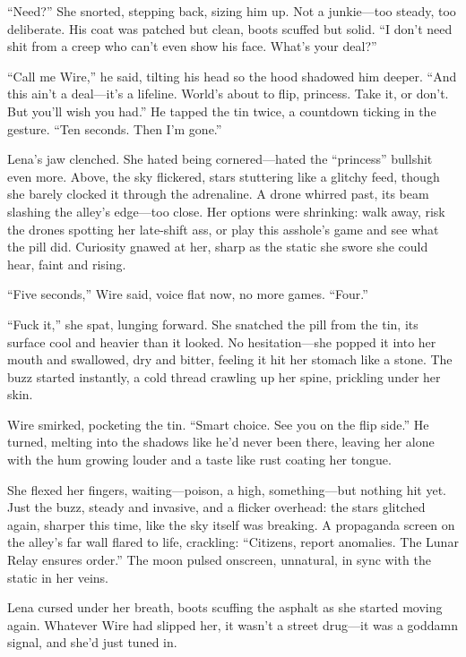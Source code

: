 \documentclass[12pt]{book}
\begin{document}
``Need?'' She snorted, stepping back, sizing him up. Not a junkie---too steady, too deliberate. His coat was patched but clean, boots scuffed but solid. ``I don't need shit from a creep who can't even show his face. What's your deal?''

``Call me Wire,'' he said, tilting his head so the hood shadowed him deeper. ``And this ain't a deal---it's a lifeline. World's about to flip, princess. Take it, or don't. But you'll wish you had.'' He tapped the tin twice, a countdown ticking in the gesture. ``Ten seconds. Then I'm gone.''

Lena's jaw clenched. She hated being cornered---hated the ``princess'' bullshit even more. Above, the sky flickered, stars stuttering like a glitchy feed, though she barely clocked it through the adrenaline. A drone whirred past, its beam slashing the alley's edge---too close. Her options were shrinking: walk away, risk the drones spotting her late-shift ass, or play this asshole's game and see what the pill did. Curiosity gnawed at her, sharp as the static she swore she could hear, faint and rising.

``Five seconds,'' Wire said, voice flat now, no more games. ``Four.''

``Fuck it,'' she spat, lunging forward. She snatched the pill from the tin, its surface cool and heavier than it looked. No hesitation---she popped it into her mouth and swallowed, dry and bitter, feeling it hit her stomach like a stone. The buzz started instantly, a cold thread crawling up her spine, prickling under her skin.

Wire smirked, pocketing the tin. ``Smart choice. See you on the flip side.'' He turned, melting into the shadows like he'd never been there, leaving her alone with the hum growing louder and a taste like rust coating her tongue.

She flexed her fingers, waiting---poison, a high, something---but nothing hit yet. Just the buzz, steady and invasive, and a flicker overhead: the stars glitched again, sharper this time, like the sky itself was breaking. A propaganda screen on the alley's far wall flared to life, crackling: ``Citizens, report anomalies. The Lunar Relay ensures order.'' The moon pulsed onscreen, unnatural, in sync with the static in her veins.

Lena cursed under her breath, boots scuffing the asphalt as she started moving again. Whatever Wire had slipped her, it wasn't a street drug---it was a goddamn signal, and she'd just tuned in.
\end{document}

